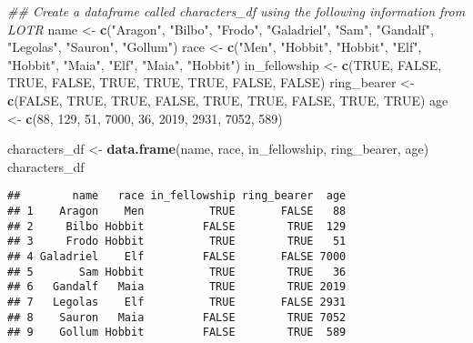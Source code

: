 \documentclass[
]{article}
\newenvironment{Shaded}{\begin{snugshade}}{\end{snugshade}}
\newcommand{\CommentTok}[1]{\textcolor[rgb]{0.56,0.35,0.01}{\textit{#1}}}
\newcommand{\DecValTok}[1]{\textcolor[rgb]{0.00,0.00,0.81}{#1}}
\newcommand{\KeywordTok}[1]{\textcolor[rgb]{0.13,0.29,0.53}{\textbf{#1}}}
\newcommand{\NormalTok}[1]{#1}
\newcommand{\OtherTok}[1]{\textcolor[rgb]{0.56,0.35,0.01}{#1}}
\newcommand{\StringTok}[1]{\textcolor[rgb]{0.31,0.60,0.02}{#1}}
\begin{document}
\begin{Shaded}
\begin{Highlighting}[]
\CommentTok{## Create a dataframe called characters_df using the following information from LOTR}
\NormalTok{name <-}\StringTok{ }\KeywordTok{c}\NormalTok{(}\StringTok{"Aragon"}\NormalTok{, }\StringTok{"Bilbo"}\NormalTok{, }\StringTok{"Frodo"}\NormalTok{, }\StringTok{"Galadriel"}\NormalTok{, }\StringTok{"Sam"}\NormalTok{, }\StringTok{"Gandalf"}\NormalTok{, }\StringTok{"Legolas"}\NormalTok{, }\StringTok{"Sauron"}\NormalTok{, }\StringTok{"Gollum"}\NormalTok{)}
\NormalTok{race <-}\StringTok{ }\KeywordTok{c}\NormalTok{(}\StringTok{"Men"}\NormalTok{, }\StringTok{"Hobbit"}\NormalTok{, }\StringTok{"Hobbit"}\NormalTok{, }\StringTok{"Elf"}\NormalTok{, }\StringTok{"Hobbit"}\NormalTok{, }\StringTok{"Maia"}\NormalTok{, }\StringTok{"Elf"}\NormalTok{, }\StringTok{"Maia"}\NormalTok{, }\StringTok{"Hobbit"}\NormalTok{)}
\NormalTok{in_fellowship <-}\StringTok{ }\KeywordTok{c}\NormalTok{(}\OtherTok{TRUE}\NormalTok{, }\OtherTok{FALSE}\NormalTok{, }\OtherTok{TRUE}\NormalTok{, }\OtherTok{FALSE}\NormalTok{, }\OtherTok{TRUE}\NormalTok{, }\OtherTok{TRUE}\NormalTok{, }\OtherTok{TRUE}\NormalTok{, }\OtherTok{FALSE}\NormalTok{, }\OtherTok{FALSE}\NormalTok{)}
\NormalTok{ring_bearer <-}\StringTok{ }\KeywordTok{c}\NormalTok{(}\OtherTok{FALSE}\NormalTok{, }\OtherTok{TRUE}\NormalTok{, }\OtherTok{TRUE}\NormalTok{, }\OtherTok{FALSE}\NormalTok{, }\OtherTok{TRUE}\NormalTok{, }\OtherTok{TRUE}\NormalTok{, }\OtherTok{FALSE}\NormalTok{, }\OtherTok{TRUE}\NormalTok{, }\OtherTok{TRUE}\NormalTok{)}
\NormalTok{age <-}\StringTok{ }\KeywordTok{c}\NormalTok{(}\DecValTok{88}\NormalTok{, }\DecValTok{129}\NormalTok{, }\DecValTok{51}\NormalTok{, }\DecValTok{7000}\NormalTok{, }\DecValTok{36}\NormalTok{, }\DecValTok{2019}\NormalTok{, }\DecValTok{2931}\NormalTok{, }\DecValTok{7052}\NormalTok{, }\DecValTok{589}\NormalTok{)}

\NormalTok{characters_df <-}\StringTok{ }\KeywordTok{data.frame}\NormalTok{(name, race, in_fellowship, ring_bearer, age)}
\NormalTok{characters_df}
\end{Highlighting}
\end{Shaded}

\begin{verbatim}
##        name   race in_fellowship ring_bearer  age
## 1    Aragon    Men          TRUE       FALSE   88
## 2     Bilbo Hobbit         FALSE        TRUE  129
## 3     Frodo Hobbit          TRUE        TRUE   51
## 4 Galadriel    Elf         FALSE       FALSE 7000
## 5       Sam Hobbit          TRUE        TRUE   36
## 6   Gandalf   Maia          TRUE        TRUE 2019
## 7   Legolas    Elf          TRUE       FALSE 2931
## 8    Sauron   Maia         FALSE        TRUE 7052
## 9    Gollum Hobbit         FALSE        TRUE  589
\end{verbatim}
\end{document}
